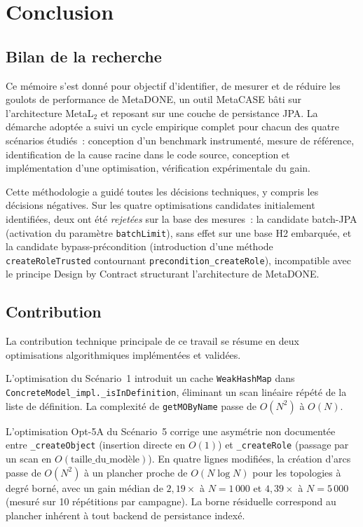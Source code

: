\chapter{Conclusion}
\label{chap:conclusion}

\section{Bilan de la recherche}

Ce mémoire s'est donné pour objectif d'identifier, de mesurer et de réduire les
goulots de performance de MetaDONE, un outil MetaCASE bâti sur l'architecture
MetaL$_2$ et reposant sur une couche de persistance JPA. La démarche adoptée a
suivi un cycle empirique complet pour chacun des quatre scénarios étudiés~:
conception d'un benchmark instrumenté, mesure de référence, identification de
la cause racine dans le code source, conception et implémentation d'une
optimisation, vérification expérimentale du gain.

Cette méthodologie a guidé toutes les décisions techniques, y compris les
décisions négatives. Sur les quatre optimisations candidates initialement
identifiées, deux ont été \emph{rejetées} sur la base des mesures~:
la candidate \og batch-JPA \fg{} (activation du paramètre \texttt{batchLimit}),
sans effet sur une base H2 embarquée, et la candidate \og bypass-précondition \fg{}
(introduction d'une méthode \texttt{createRoleTrusted} contournant
\texttt{precondition\_createRole}), incompatible avec le principe Design by
Contract structurant l'architecture de MetaDONE. %

\section{Contribution}

La contribution technique principale de ce travail se résume en deux
optimisations algorithmiques implémentées et validées.

L'optimisation du Scénario~1 introduit un cache \texttt{WeakHashMap} dans
\texttt{ConcreteModel\_impl.\_isInDefinition}, éliminant un scan linéaire
répété de la liste de définition. La complexité de \texttt{getMOByName} passe
de $O(N^2)$ à $O(N)$.

L'optimisation Opt-5A du Scénario~5 corrige une asymétrie non documentée entre
\texttt{\_createObject} (insertion directe en $O(1)$) et \texttt{\_createRole}
(passage par un scan en $O(\text{taille\_du\_modèle})$). En quatre lignes
modifiées, la création d'arcs passe de $O(N^2)$ à un plancher proche de
$O(N \log N)$ pour les topologies à degré borné, avec un gain médian de
$2{,}19\times$ à $N = 1\,000$ et $4{,}39\times$ à $N = 5\,000$ (mesuré sur
10 répétitions par campagne). La borne résiduelle correspond au plancher inhérent à tout
backend de persistance indexé.

